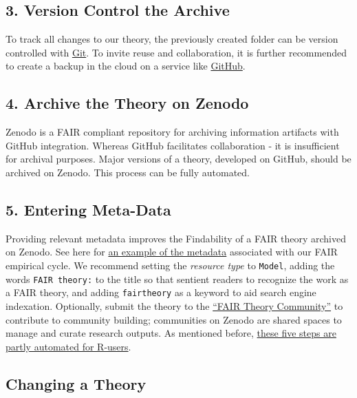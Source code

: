 \documentclass[
  man, noextraspace,floatsintext]{apa7}
\begin{document}
\subsection{3. Version Control the Archive}\label{version-control-the-archive}

To track all changes to our theory, the previously created folder can be version controlled with \href{https://git-scm.com/book/en/v2/Getting-Started-Installing-Git}{Git}.
To invite reuse and collaboration, it is further recommended to create a backup in the cloud on a service like \href{https://github.blog/developer-skills/github/beginners-guide-to-github-repositories-how-to-create-your-first-repo/}{GitHub}.

\subsection{4. Archive the Theory on Zenodo}\label{archive-the-theory-on-zenodo}

Zenodo is a FAIR compliant repository for archiving information artifacts with GitHub integration.
Whereas GitHub facilitates collaboration - it is insufficient for archival purposes.
Major versions of a theory, developed on GitHub, should be archived on Zenodo.
This process can be fully automated.

\subsection{5. Entering Meta-Data}\label{entering-meta-data}

Providing relevant metadata improves the Findability of a FAIR theory archived on Zenodo.
See here for \href{https://raw.githubusercontent.com/cjvanlissa/fair_theory/refs/heads/main/example_metadata.json}{an example of the metadata} associated with our FAIR empirical cycle.
We recommend setting the \emph{resource type} to \texttt{Model}, adding the words \texttt{FAIR\ theory:} to the title so that sentient readers to recognize the work as a FAIR theory, and adding \texttt{fairtheory} as a keyword to aid search engine indexation. Optionally, submit the theory to the \href{https://zenodo.org/communities/fairtheory}{``FAIR Theory Community''} to contribute to community building; communities on Zenodo are shared spaces to manage and curate research outputs.
As mentioned before, \href{https://cjvanlissa.github.io/theorytools/articles/fair-theory.html}{these five steps are partly automated for R-users}.

\subsection{Changing a Theory}\label{changing-a-theory}
\end{document}
